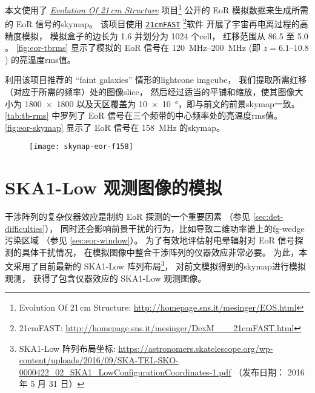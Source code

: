 本文使用了
\href{http://homepage.sns.it/mesinger/EOS.html}{\textit{Evolution Of 21\,cm Structure}}
项目\footnote{%
  Evolution Of 21\,cm Structure:
  \url{http://homepage.sns.it/mesinger/EOS.html}
} 公开的 EoR 模拟数据来生成所需的 EoR 信号的\ac{skymap}。
该项目使用
\href{http://homepage.sns.it/mesinger/DexM___21cmFAST.html}{\texttt{21cmFAST}}%
\footnote{%
  21cmFAST: \url{http://homepage.sns.it/mesinger/DexM___21cmFAST.html}
}软件\cite{mesinger2011}
开展了宇宙再电离过程的高精度模拟，
模拟盒子的边长为 \SI{1.6}{\Gpc} 并划分为 1024 个\ac{cell}，
红移范围从 86.5 至 5.0 \cite{mesinger2016}。
\autoref{fig:eor-tbrms} 显示了模拟的 EoR 信号在 \SIrange{120}{200}{\MHz}
(即 $z = \numrange{6.1}{10.8}$) 的亮温度\ac{rms}值。

利用该项目推荐的 \enquote{faint galaxies} 情形的\ac{lightcone} \ac{imgcube}，
我们提取所需红移（对应于所需的频率）处的图像\ac{slice}，
然后经过适当的平铺和缩放，使其图像大小为 \num{1800 x 1800}
以及天区覆盖为 \SI{10 x 10}{\degree}，即与前文的前景\ac{skymap}一致。
\autoref{tab:tb-rms} 中罗列了 EoR 信号在三个频带的中心频率处的亮温度\ac{rms}值。
\autoref{fig:eor-skymap} 显示了 EoR 信号在 \SI{158}{\MHz} 的\ac{skymap}。

\begin{figure}[htp]
  \centering
  \texttt{[image: skymap-eor-f158]}
  \label{fig:eor-skymap}
\end{figure}


\section{SKA1-Low 观测图像的模拟}
\label{sec:obs-simu}

干涉阵列的复杂仪器效应是制约 EoR 探测的一个重要因素
（参见 \autoref{sec:det-difficulties}），
同时还会影响前景干扰的行为，比如导致二维功率谱上的\ac{fg-wedge}污染区域
（参见 \autoref{sec:eor-window}）。
为了有效地评估射电晕辐射对 EoR 信号探测的具体干扰情况，
在模拟图像中整合干涉阵列的仪器效应非常必要。
为此，本文采用了目前最新的 SKA1-Low 阵列布局\footnote{\raggedright%
  SKA1-Low 阵列布局坐标:
  \url{https://astronomers.skatelescope.org/wp-content/uploads/2016/09/SKA-TEL-SKO-0000422_02_SKA1_LowConfigurationCoordinates-1.pdf}
  （发布日期： 2016 年 5 月 31 日）}，
对前文模拟得到的\ac{skymap}进行模拟观测，
获得了包含仪器效应的 SKA1-Low 观测图像。


